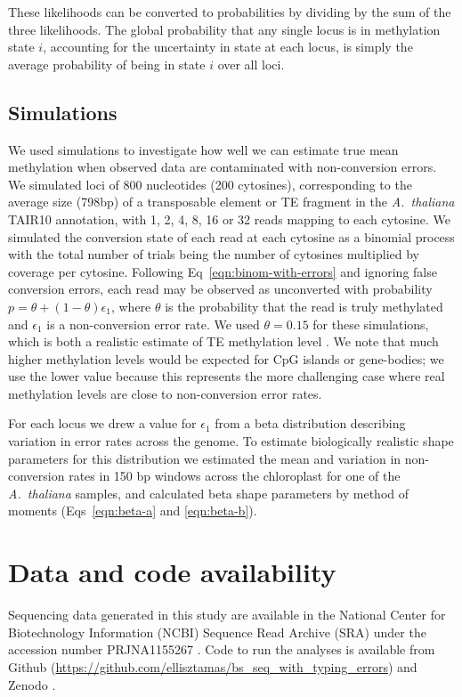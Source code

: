 \documentclass[10pt,draft,letterpaper]{article}
\begin{document}
These likelihoods can be converted to probabilities by dividing by the sum of the three likelihoods.
The global probability that any single locus is in methylation state $i$, accounting for the uncertainty in state at each locus, is simply the average probability of being in state $i$ over all loci.

\subsection*{Simulations}

We used simulations to investigate how well we can estimate true mean methylation when observed data are contaminated with non-conversion errors.
We simulated loci of 800 nucleotides (200 cytosines), corresponding to the average size (798bp) of a transposable element or TE fragment in the \textit{A.~thaliana} TAIR10 annotation, with 1, 2, 4, 8, 16 or 32 reads mapping to each cytosine.
We simulated the conversion state of each read at each cytosine as a binomial process with the total number of trials being the number of cytosines multiplied by coverage per cytosine.
Following Eq~\ref{eqn:binom-with-errors} and ignoring false conversion errors, each read may be observed as unconverted with probability $p=\theta + (1-\theta)\epsilon_1$, where $\theta$ is the probability that the read is truly methylated and $\epsilon_1$ is a non-conversion error rate.
We used $\theta=0.15$ for these simulations, which is both a realistic estimate of TE methylation level \cite{dubin2015dna}.
We note that much higher methylation levels would be expected for CpG islands or gene-bodies; we use the lower value because this represents the more challenging case where real methylation levels are close to non-conversion error rates.

For each locus we drew a value for $\epsilon_1$ from a beta distribution describing variation in error rates across the genome.
To estimate biologically realistic shape parameters for this distribution we estimated the mean and variation in non-conversion rates in 150 bp windows across the chloroplast for one of the \emph{A.~thaliana} samples, and calculated beta shape parameters by method of moments (Eqs~\ref{eqn:beta-a} and \ref{eqn:beta-b}).

\section*{Data and code availability}

Sequencing data generated in this study are available in the National Center for Biotechnology Information (NCBI) Sequence Read Archive (SRA) under the accession number PRJNA1155267 \cite{ellis2023datafrom}.
Code to run the analyses is available from Github (\url{https://github.com/ellisztamas/bs_seq_with_typing_errors}) and Zenodo \cite{ellis2023codefrom}.
\end{document}
